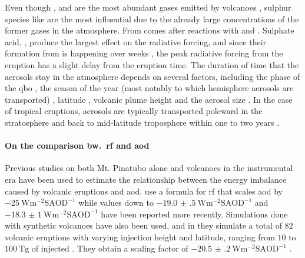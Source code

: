 \documentclass{ametsocV5}
\newcommand{\iso}[1][i]{{#1}njected \ce{SO2}}
\begin{document}
Even though ,  and  are the most abundant gases emitted by
volcanoes \citep{robock2000}, sulphur species like  are the most influential due
to the already large concentrations of the former gases in the atmosphere. From 
comes  after reactions with  and  \citep{robock2000}. Sulphate
acid, , produce the largest effect on the radiative forcing, and since their
formation from  is happening over weeks \citep{robock2000}, the peak radiative
forcing from the eruption has a slight delay from the eruption time. The duration of
time that the  aerosols stay in the atmosphere depends on several factors,
including the phase of the \acrshort{qbo} \citep{pitari2016b}, the season of the year
(most notably to which hemisphere aerosols are transported)
\citep{toohey2011,toohey2019}, latitude \citep{marshall2019,toohey2019}, volcanic plume
height \citep{marshall2019} and the aerosol size \citep{marshall2019}. In the case of
tropical eruptions, aerosols are typically transported poleward in the stratosphere and
back to mid-latitude troposphere within one to two years \citep{robock2000}.


\paragraph*{On the comparison bw.\ \acrshort{rf} and \acrshort{aod}}

Previous studies on both Mt. Pinatubo alone \citep{mills2017,hansen2005} and volcanoes
in the instrumental era \citep{gregory2016} have been used to estimate the relationship
between the energy imbalance caused by volcanic eruptions and \acrshort{aod}.
\citet{myhre2013} use a formula for \acrshort{rf} that scales \acrshort{aod} by
\(\SI{-25}{\watt\metre^{-2}\mathrm{SAOD}^{-1}}\) while values down to
\(\SI{-19.0(5)}{\watt\metre^{-2}\mathrm{SAOD}^{-1}}\) \citep{gregory2016} and
\(\SI{-18.3(10)}{\watt\metre^{-2}\mathrm{SAOD}^{-1}}\) \citep{mills2017} have been
reported more recently. Simulations done with synthetic volcanoes have also been used,
and in \citet{marshall2020} they simulate a total of \(82\) volcanic eruptions with
varying injection height and latitude, ranging from \(10\) to \(\SI{100}{\tera\gram}\)
of \iso{}. They obtain a scaling factor of
\(\SI{-20.5(2)}{\watt\metre^{-2}\mathrm{SAOD}^{-1}}\) \citep{marshall2020}.
\end{document}
